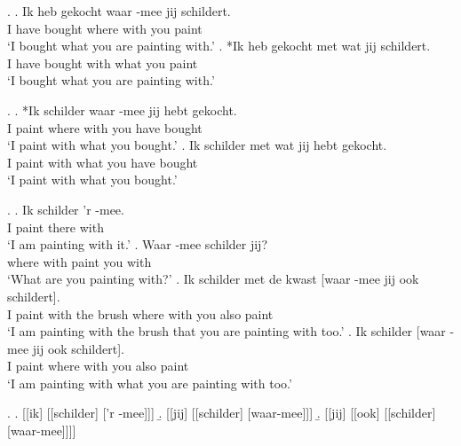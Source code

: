 \documentclass[xcolor=dvipsnames,10pt]{beamer}
\begin{document}
\begin{frame}

\ex.
\ag. Ik heb gekocht waar -mee jij schildert.\\
 I have bought where with you paint\\
 `I bought what you are painting with.'\label{ex:gekochtwaar-mee}
\bg. *Ik heb gekocht met wat jij schildert.\\
 I have bought with what you paint\\
 `I bought what you are painting with.'\label{ex:gekochtmetwat}

\pause

\ex.\label{ex:schildermet}
\ag. *Ik schilder waar -mee jij hebt gekocht.\\
 I paint where with you have bought\\
 `I paint with what you bought.'\label{ex:schilderwaar-mee}
\bg. Ik schilder met wat jij hebt gekocht.\\
 I paint with what you have bought\\
 `I paint with what you bought.'\label{ex:schildermetwat}


\end{frame}


\begin{frame}

\ex.
\ag. Ik schilder 'r -mee.\\
 I paint there with\\
 `I am painting with it.'\label{ex:const1}
\bg. Waar -mee schilder jij?\\
where with paint you with\\
 `What are you painting with?'\label{ex:const2}
\bg. Ik schilder met de kwast [waar -mee jij ook schildert].\\
 I paint with the brush where with you also paint\\
 `I am painting with the brush that you are painting with too.'\label{ex:const3}
\bg. Ik schilder [waar -mee jij ook schildert].\\
 I paint where with you also paint\\
 `I am painting with what you are painting with too.'\label{ex:const4}

\pause

\ex.
\a. [[ik] [[schilder] ['r -mee]]]\label{ex:const1stage}
\b. [[jij] [[schilder] [waar-mee]]]\label{ex:const2stage}
\b. [[jij] [[ook] [[schilder] [waar-mee]]]]\label{ex:const3stage}

\end{frame}
\end{document}
